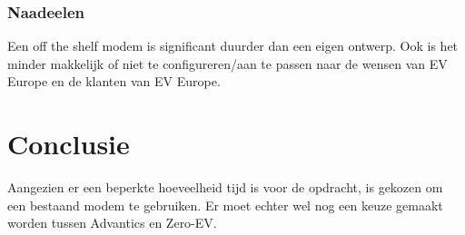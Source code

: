 \subsubsection{Naadeelen}

Een off the shelf modem is significant duurder dan een eigen ontwerp. Ook is
het minder makkelijk of niet te configureren/aan te passen naar de wensen van
EV Europe en de klanten van EV Europe.

\section{Conclusie}

Aangezien er een beperkte hoeveelheid tijd is voor de opdracht, is gekozen om
een bestaand modem te gebruiken. Er moet echter wel nog een keuze gemaakt
worden tussen Advantics en Zero-EV.